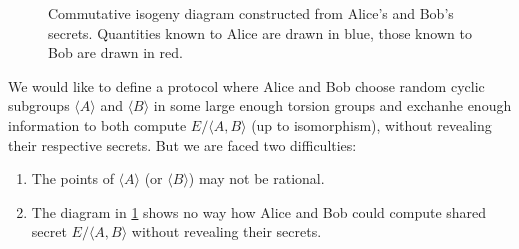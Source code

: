 \documentclass{article}
\theoremstyle{theorem}
\theoremstyle{definition}
\begin{document}
\begin{figure}
	\centering
\caption{Commutative isogeny diagram constructed from Alice's and
	Bob's secrets. Quantities known to Alice are drawn in blue, those known to Bob are drawn in red.} \label{SIDH-diagram:figure}
\end{figure}

We would like to define a protocol where Alice and Bob choose random cyclic subgroups $\langle A \rangle$ and $\langle B \rangle$ in some large enough torsion groups and exchanhe enough information to both compute $E/ \langle A, B \rangle$ (up to isomorphism), without revealing their respective secrets. But we are faced two difficulties:

	\begin{enumerate}
		\item The points of $\langle A \rangle$ (or $\langle B \rangle$) may not be rational.
		
		\item The diagram in \cref{SIDH-diagram:figure} shows no way how Alice and Bob could compute shared secret $E/\langle A, B \rangle$ without revealing their secrets.
	\end{enumerate}
\end{document}
